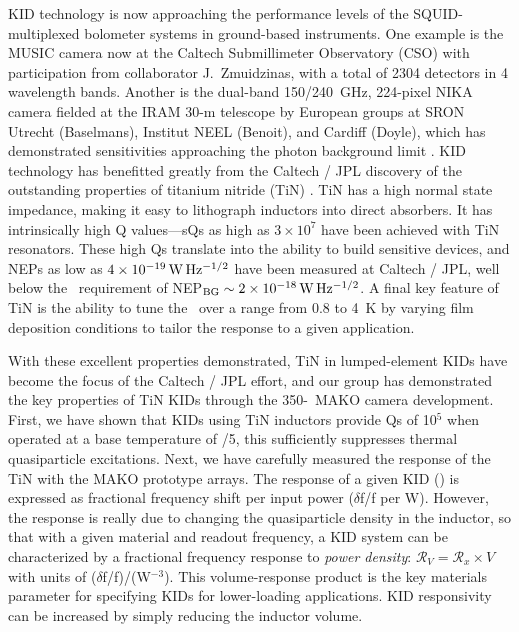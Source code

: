 KID technology is now approaching the performance levels of the SQUID-multiplexed bolometer systems in ground-based instruments.  One example is the MUSIC camera now at the Caltech Submillimeter Observatory (CSO) \cite{Schlaerth_10} with participation from collaborator J.\ Zmuidzinas, with a total of 2304 detectors in 4 wavelength bands.  Another is the dual-band 150/240~GHz, 224-pixel NIKA camera fielded at the IRAM 30-m telescope by European groups at SRON Utrecht (Baselmans), Institut NEEL (Benoit), and Cardiff (Doyle), which has demonstrated sensitivities approaching the photon background limit  \citep{Monfardini_11, Yates_11,Calvo_13}. 
KID technology has benefitted greatly from the Caltech / JPL discovery of the outstanding properties of titanium nitride (TiN) \cite{LeDuc_10}.   TiN has a high normal state impedance, making it easy to lithograph inductors into direct absorbers.  It has intrinsically high Q values---sQs as high as $3\times10^{7}$ have been achieved with TiN resonators.  These high Qs translate into the ability to build sensitive devices, and NEPs as low as $4\times10^{-19}\,\rm W\,Hz^{-1/2}$ have been measured at Caltech / JPL,  well below the \icaris\ requirement of NEP$_{\rm BG}\sim2\times10^{-18}\,\rm W\,Hz^{-1/2}$.   A final key feature of TiN is the ability to tune the \Tc\ over a range from 0.8 to 4~K by varying film deposition conditions to tailor the response to a given application.  

\vspace{0.05in}{\bf Measured TIN KID Q and responsivity.}   With these excellent properties demonstrated, TiN in lumped-element KIDs have become the focus of the Caltech / JPL effort, and our group has demonstrated the key properties of TiN KIDs through the 350-\mum\ MAKO camera development.  
First, we have shown that KIDs using TiN inductors provide Qs of 10$^5$ when operated at a base temperature of \Tc /5, this sufficiently suppresses thermal quasiparticle excitations. 
Next, we have carefully measured the response of the TiN with the MAKO prototype arrays.  The response of a given KID (\response) is expressed as fractional frequency shift per input power ($\delta$f/f per W).  However, the response is really due to changing the quasiparticle density in the inductor, so that with a given material and readout frequency, a KID system can be  characterized by a fractional frequency response to {\it power density}: $\mathcal{R}_V = \mathcal{R}_x\!\times\!V$ with units of ($\delta$f/f)/(W\mum$^{-3}$). This volume-response product is the key materials parameter for specifying KIDs for lower-loading applications.  KID responsivity can be increased  by simply reducing the inductor volume.

